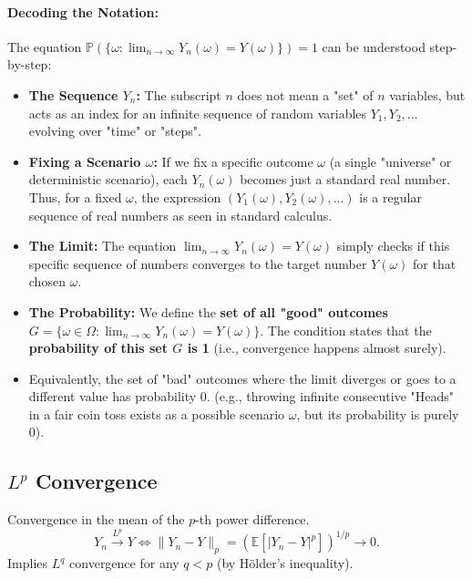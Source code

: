 \paragraph{Decoding the Notation:}
The equation $\mathbb{P}(\{ \omega : \lim_{n\to\infty} Y_n(\omega) = Y(\omega) \}) = 1$ can be understood step-by-step:
\begin{itemize}
    \item \textbf{The Sequence $Y_n$:} The subscript $n$ does not mean a "set" of $n$ variables, but acts as an index for an infinite sequence of random variables $Y_1, Y_2, \dots$ evolving over "time" or "steps". 
    \item \textbf{Fixing a Scenario $\omega$:} If we fix a specific outcome $\omega$ (a single "universe" or deterministic scenario), each $Y_n(\omega)$ becomes just a standard real number. Thus, for a fixed $\omega$, the expression $(Y_1(\omega), Y_2(\omega), \dots)$ is a regular sequence of real numbers as seen in standard calculus.
    \item \textbf{The Limit:} The equation $\lim_{n \to \infty} Y_n(\omega) = Y(\omega)$ simply checks if this specific sequence of numbers converges to the target number $Y(\omega)$ for that chosen $\omega$.
    \item \textbf{The Probability:} We define the \textbf{set of all "good" outcomes} $G = \{ \omega \in \Omega : \lim_{n\to\infty} Y_n(\omega) = Y(\omega) \}$. The condition states that the \textbf{probability of this set $G$ is 1} (i.e., convergence happens almost surely).
    \item Equivalently, the set of "bad" outcomes where the limit diverges or goes to a different value has probability $0$. (e.g., throwing infinite consecutive "Heads" in a fair coin toss exists as a possible scenario $\omega$, but its probability is purely $0$).
\end{itemize}

\subsection{\texorpdfstring{$L^p$}{Lp} Convergence}
Convergence in the mean of the $p$-th power difference.
\[
Y_n \xrightarrow{L^p} Y \iff \|Y_n - Y\|_p = \left( \mathbb{E}[|Y_n - Y|^p] \right)^{1/p} \to 0.
\]
Implies $L^q$ convergence for any $q < p$ (by Hölder's inequality).

